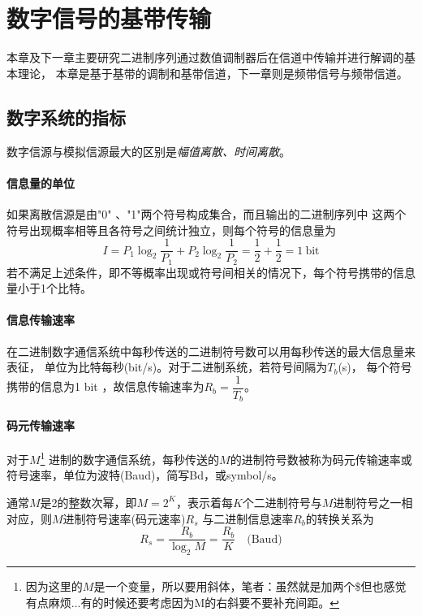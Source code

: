 \section{数字信号的基带传输}\label{chapter:V}

    本章及下一章主要研究二进制序列通过数值调制器后在信道中传输并进行解调的基本理论，
    本章是基于基带的调制和基带信道，下一章则是频带信号与频带信道。

\subsection{数字系统的指标}

    数字信源与模拟信源最大的区别是\emph{幅值离散、时间离散}。
    
    \paragraph{信息量的单位}\mbox{}

    如果离散信源是由"0" 、"1"两个符号构成集合，而且输出的二进制序列中
    这两个符号出现概率相等且各符号之间统计独立，则每个符号的信息量为
    \begin{equation}
        I=P_1\log_2\frac{1}{P_1}+P_2\log_2\frac{1}{P_2}=\frac{1}{2}+\frac{1}{2}=1~\text{bit}
    \end{equation}
    若不满足上述条件，即不等概率出现或符号间相关的情况下，每个符号携带的信息量小于1个比特。

    \paragraph{信息传输速率}\mbox{}

    在二进制数字通信系统中每秒传送的二进制符号数可以用每秒传送的最大信息量来表征，
    单位为比特每秒(bit/s)。对于二进制系统，若符号间隔为$T_b$(s)，
    每个符号携带的信息为1 bit ，故信息传输速率为$R_b=\dfrac{1}{T_b}$。

    \paragraph{码元传输速率}\mbox{}

    对于$M$\footnote{因为这里的$M$是一个变量，所以要用斜体，笔者：虽然就是加两个\$但也感觉有点麻烦...有的时候还要考虑因为M的右斜要不要补充间距。}
    进制的数字通信系统，每秒传送的$M$的进制符号数被称为码元传输速率或符号速率，单位为波特(Baud)，简写Bd，或symbol/s。

    通常$M$是2的整数次幂，即$M=2^K$，表示着每$K$个二进制符号与$M$进制符号之一相对应，则$M$进制符号速率(码元速率)$R_s$
    与二进制信息速率$R_b$的转换关系为
    \begin{equation}
        R_s=\frac{R_b}{\displaystyle\log_2M}=\frac{R_b}{K}\hspace{1em}\text{(Baud)}
    \end{equation}

